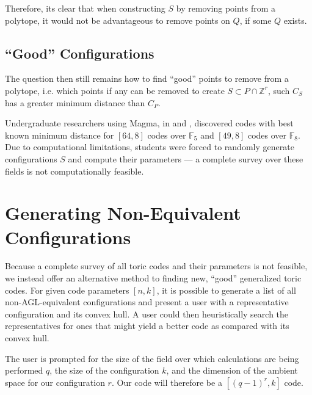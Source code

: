 \documentclass[12pt]{amsart}
\theoremstyle{plain}
\newcommand{\F}{\mathbb{F}}
\newcommand{\Int}{\mathbb{Z}}
\begin{document}
Therefore, its clear that when constructing $S$ by removing points from a polytope, it would not be advantageous to remove points on $Q$, if some $Q$ exists.
\subsection{``Good'' Configurations}
The question then still remains how to find ``good'' points to remove from a polytope, i.e. which points if any can be removed to create $S \subset P \cap \Int^r$, such $C_S$ has a greater minimum distance than $C_P$.

Undergraduate researchers using Magma, in \cite{census1} and \cite{census2}, discovered codes with best known minimum distance for $\left[64,8\right]$ codes over $\F_5$ and $\left[49,8\right]$ codes over $\F_8$. Due to computational limitations, students were forced to randomly generate configurations $S$ and compute their parameters --- a complete survey over these fields is not computationally feasible.

\section{Generating Non-Equivalent Configurations}
Because a complete survey of all toric codes and their parameters is not feasible, we instead offer an alternative method to finding new, ``good'' generalized toric codes. For given code parameters $\left[n,k\right]$, it is possible to generate a list of all non-AGL-equivalent configurations and present a user with a representative configuration and its convex hull. A user could then heuristically search the representatives for ones that might yield a better code as compared with its convex hull.

The user is prompted for the size of the field over which calculations are being performed $q$, the size of the configuration $k$, and the dimension of the ambient space for our configuration $r$. Our code will therefore be a $\left[(q-1)^r,k\right]$ code.
\end{document}
